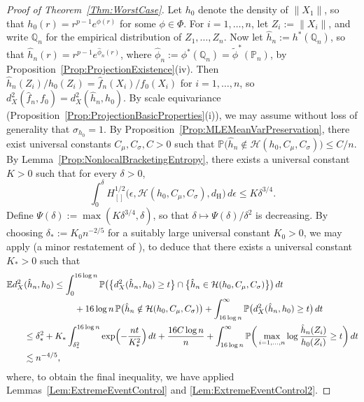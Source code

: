 \documentclass[a4paper,12pt]{article}
\begin{document}
\begin{proof}[Proof of Theorem~\ref{Thm:WorstCase}]
Let $h_0$ denote the density of $\|X_1\|$, so that $h_0(r) = r^{p-1} e^{\phi(r)}$ for some $\phi \in \Phi$.  For $i=1,\ldots,n$, let $Z_i := \|X_i\|$, and write $\mathbb{Q}_n$ for the empirical distribution of $Z_1,\ldots,Z_n$.  Now let $\hat{h}_n := h^*(\mathbb{Q}_n)$, so that $\hat{h}_n(r) = r^{p-1}e^{\hat{\phi}_n(r)}$, where $\hat{\phi}_n := \phi^*(\mathbb{Q}_n) = \tilde{\phi}^*(\mathbb{P}_n)$, by Proposition~\ref{Prop:ProjectionExistence}(iv).  Then $\hat{h}_n(Z_i)/h_0(Z_i) = \hat{f}_n(X_i)/f_0(X_i)$ for $i=1,\ldots,n$, so $d^2_X(\hat{f}_n,f_0) = d^2_X(\hat{h}_n,h_0)$.  By scale equivariance (Proposition~\ref{Prop:ProjectionBasicProperties}(i)), we may assume without loss of generality that $\sigma_{h_0} = 1$.  By Proposition~\ref{Prop:MLEMeanVarPreservation}, there exist universal constants $C_\mu, C_\sigma, C > 0$ such that $\mathbb{P}\bigl(\hat{h}_n \notin \mathcal{H}(h_0, C_\mu, C_{\sigma})\bigr) \leq C/n$. By Lemma~\ref{Prop:NonlocalBracketingEntropy}, there exists a universal constant $K > 0$ such that for every $\delta > 0$,
\[
  \int_0^\delta H^{1/2}_{[]}\bigl(\epsilon, \mathcal{H}(h_0, C_\mu, C_\sigma), d_{\mathrm{H}}\bigr) \, d\epsilon \leq K \delta^{3/4}.
\]
Define $\Psi(\delta) := \max(K\delta^{3/4},\delta)$, so that $\delta \mapsto \Psi(\delta)/\delta^2$ is decreasing.  By choosing $\delta_* := K_0n^{-2/5}$ for a suitably large universal constant $K_0 > 0$, we may apply \citet[][Theorem 10]{kim2016adaptationsupp} (a minor restatement of \citet[][Corollary~7.5]{vandegeer2000empirical}), to deduce that there exists a universal constant $K_* > 0$ such that
\begin{align*}
\mathbb{E} d_X^2&( \hat{h}_n, h_0) \leq \int_0^{16 \log n}  \mathbb{P}\big( \bigl\{d_X^2(\hat{h}_n, h_0) \geq t\bigr\} \cap
                             \bigl\{\hat{h}_n \in \mathcal{H}(h_0, C_\mu, C_\sigma)\bigr\} \big) \, dt \\
                             &\hspace{2cm} +16 \log n \, \mathbb{P}\bigl( \hat{h}_n \notin \mathcal{H}(h_0, C_\mu, C_\sigma)\bigr) +
                             \int_{16 \log n}^\infty \mathbb{P}\big( d_X^2(\hat{h}_n, h_0) \geq t \big) \, dt
                             \\
&\leq \delta_*^2 + K_* \int_{\delta^2_*}^{16 \log n}  \exp\Bigl( - \frac{n t}{K_*^2} \Bigr) \, dt + \frac{16C \log n}{n} +
                             \int_{16 \log n}^\infty \mathbb{P}\bigg( \max_{i=1,\ldots,n} \log \frac{\hat{h}_n(Z_i)}{h_0(Z_i)}  \geq t \bigg) \, dt \\
&\lesssim n^{-4/5},
\end{align*}
where, to obtain the final inequality, we have applied Lemmas~\ref{Lem:ExtremeEventControl} and \ref{Lem:ExtremeEventControl2}.
\end{proof}
\end{document}
